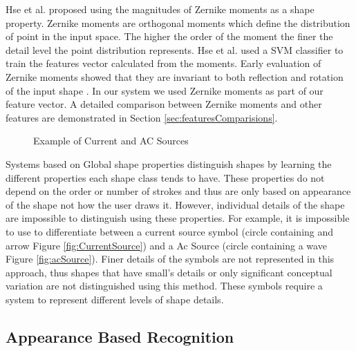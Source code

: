 Hse et al. \cite{HeloiseBeautification,zernike61} proposed using the magnitudes of Zernike moments as a shape property. Zernike moments are orthogonal moments which define the distribution of point in the input space. The higher the order of the moment the finer the detail level the point distribution represents. Hse et al. \cite{HeloiseBeautification,zernike61} used a SVM classifier to train the features vector calculated from the moments. Early evaluation of Zernike moments showed that they are invariant to both reflection and rotation of the input shape \cite{ZerMomentOrthogonal}. In our system we used Zernike moments as part of our feature vector. A detailed comparison between Zernike moments and other features are demonstrated in Section \ref{sec:featuresComparisions}. 
 
 
 \begin{figure}[]
	\centering
 
	\caption{Example of Current and AC Sources}
	\label{fig:ACandCurrentSources}
\end{figure}

 Systems based on Global shape properties distinguish shapes by learning the different properties each shape class tends to have. These properties do not depend on the order or number of strokes and thus are only based on appearance of the shape not how the user draws it. However, individual details of the shape are impossible to distinguish using these properties. For example, it is impossible to use to differentiate between a current source symbol (circle containing and arrow Figure \ref{fig:CurrentSource}) and a Ac Source (circle containing a wave Figure \ref{fig:acSource}).  Finer details of the symbols are not represented in this approach, thus shapes that have small's details or only significant conceptual variation are not distinguished using this method. These symbols require a system to represent different levels of shape details.  
  
\subsection{Appearance Based Recognition}
\label{sec:ApperanceBasedRecognition}

